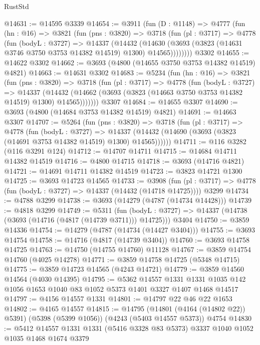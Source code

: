 \begin{lexlean}{RustStd}
\begin{coremodule}
@14631 := @14595 @3339
@14654 := @3911
    (fun (D : @1148) =>
    @4777
      (fun (hn : @16) =>
      @3821
        (fun (pns : @3820) =>
        @3718
          (fun (pl : @3717) =>
          @4778
            (fun (bodyL : @3727) =>
            @14337
              (@14432
                (@14630 (@3693 (@3823 (@14631 @3746 @3750 @3753 @14382 @14519) @1300) @14565))))))))
    @3302
@14655 := @14622 @3302
@14662 := @3693 (@4800 (@14655 @3750 @3753 @14382 @14519) @4821)
@14663 := @14631 @3302
@14683 := @5234
    (fun (hn : @16) =>
    @3821
      (fun (pns : @3820) =>
      @3718
        (fun (pl : @3717) =>
        @4778
          (fun (bodyL : @3727) =>
          @14337
            (@14432 (@14662 (@3693 (@3823 (@14663 @3750 @3753 @14382 @14519) @1300) @14565)))))))
    @3307
@14684 := @14655 @3307
@14690 := @3693 (@4800 (@14684 @3753 @14382 @14519) @4821)
@14691 := @14663 @3307
@14707 := @5264
    (fun (pns : @3820) =>
    @3718
      (fun (pl : @3717) =>
      @4778
        (fun (bodyL : @3727) =>
        @14337 (@14432 (@14690 (@3693 (@3823 (@14691 @3753 @14382 @14519) @1300) @14565))))))
@14711 := @116 @3282 (@116 @3291 @124)
@14712 := @14707 @14711
@14715 := @14684 @14711 @14382 @14519
@14716 := @4800 @14715
@14718 := @3693 (@14716 @4821)
@14721 := @14691 @14711 @14382 @14519
@14723 := @3823 @14721 @1300
@14725 := @3693 @14723 @14565
@14733 := @3908
    (fun (pl : @3717) => @4778 (fun (bodyL : @3727) => @14337 (@14432 (@14718 @14725))))
    @3299
@14734 := @4788 @3299
@14738 := @3693 (@14279 (@4787 (@14734 @14428)))
@14739 := @4818 @3299
@14749 := @5311
    (fun (bodyL : @3727) => @14337 (@14738 (@3693 (@14716 (@4817 (@14739 @3711))) @14725)))
    @3404
@14750 := @3859 @14336
@14754 := @14279 (@4787 (@14734 (@14427 @3404)))
@14755 := @3693 @14754
@14758 := @14716 (@4817 (@14739 @3404))
@14760 := @3693 @14758 @14725
@14763 := @14750 (@14755 @14760) @11128
@14767 := @3859 @14754 @14760 (@4025 @14278)
@14771 := @3859 @14758 @14725 (@5348 @14715)
@14775 := @3859 @14723 @14565 (@4243 @14721)
@14779 := @3859 @14560 @14564 (@4030 @14395)
@14795 := @5362
    @14557
    @1331
    @1331
    @1035
    @142
    @1056
    @1653
    @1040
    @83
    @1052
    @5373
    @1401
    @3327
    @1407
    @1468
    @14517
@14797 := @4156 @14557 @1331
@14801 := @14797 @22 @46 @22 @1653
@14802 := @4165 @14557
@14815 := @14795
    (@14801 (@4164 (@14802 @22)) @5391)
    (@5398 (@5399 @1056))
    (@4243 (@5403 @14557 @5373))
    @4754
@14830 := @5412
    @14557
    @1331
    @1331
    (@5416 @3328 @83 @5373)
    @3337
    @1040
    @1052
    @1035
    @1468
    @1674
    @3379

\end{coremodule}
\end{lexlean}
